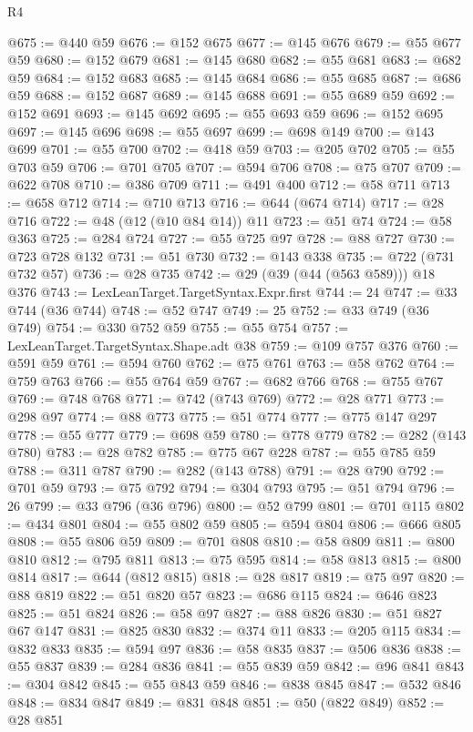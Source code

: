 \begin{lexlean}{R4}
\begin{coremodule}
@675 := @440 @59
@676 := @152 @675
@677 := @145 @676
@679 := @55 @677 @59
@680 := @152 @679
@681 := @145 @680
@682 := @55 @681
@683 := @682 @59
@684 := @152 @683
@685 := @145 @684
@686 := @55 @685
@687 := @686 @59
@688 := @152 @687
@689 := @145 @688
@691 := @55 @689 @59
@692 := @152 @691
@693 := @145 @692
@695 := @55 @693 @59
@696 := @152 @695
@697 := @145 @696
@698 := @55 @697
@699 := @698 @149
@700 := @143 @699
@701 := @55 @700
@702 := @418 @59
@703 := @205 @702
@705 := @55 @703 @59
@706 := @701 @705
@707 := @594 @706
@708 := @75 @707
@709 := @622 @708
@710 := @386 @709
@711 := @491 @400
@712 := @58 @711
@713 := @658 @712
@714 := @710 @713
@716 := @644 (@674 @714)
@717 := @28 @716
@722 := @48 (@12 (@10 @84 @14)) @11
@723 := @51 @74
@724 := @58 @363
@725 := @284 @724
@727 := @55 @725 @97
@728 := @88 @727
@730 := @723 @728 @132
@731 := @51 @730
@732 := @143 @338
@735 := @722 (@731 @732 @57)
@736 := @28 @735
@742 := @29 (@39 (@44 (@563 @589))) @18 @376
@743 := LexLeanTarget.TargetSyntax.Expr.first
@744 := 24
@747 := @33 @744 (@36 @744)
@748 := @52 @747
@749 := 25
@752 := @33 @749 (@36 @749)
@754 := @330 @752 @59
@755 := @55 @754
@757 := LexLeanTarget.TargetSyntax.Shape.adt @38
@759 := @109 @757 @376
@760 := @591 @59
@761 := @594 @760
@762 := @75 @761
@763 := @58 @762
@764 := @759 @763
@766 := @55 @764 @59
@767 := @682 @766
@768 := @755 @767
@769 := @748 @768
@771 := @742 (@743 @769)
@772 := @28 @771
@773 := @298 @97
@774 := @88 @773
@775 := @51 @774
@777 := @775 @147 @297
@778 := @55 @777
@779 := @698 @59
@780 := @778 @779
@782 := @282 (@143 @780)
@783 := @28 @782
@785 := @775 @67 @228
@787 := @55 @785 @59
@788 := @311 @787
@790 := @282 (@143 @788)
@791 := @28 @790
@792 := @701 @59
@793 := @75 @792
@794 := @304 @793
@795 := @51 @794
@796 := 26
@799 := @33 @796 (@36 @796)
@800 := @52 @799
@801 := @701 @115
@802 := @434 @801
@804 := @55 @802 @59
@805 := @594 @804
@806 := @666 @805
@808 := @55 @806 @59
@809 := @701 @808
@810 := @58 @809
@811 := @800 @810
@812 := @795 @811
@813 := @75 @595
@814 := @58 @813
@815 := @800 @814
@817 := @644 (@812 @815)
@818 := @28 @817
@819 := @75 @97
@820 := @88 @819
@822 := @51 @820 @57
@823 := @686 @115
@824 := @646 @823
@825 := @51 @824
@826 := @58 @97
@827 := @88 @826
@830 := @51 @827 @67 @147
@831 := @825 @830
@832 := @374 @11
@833 := @205 @115
@834 := @832 @833
@835 := @594 @97
@836 := @58 @835
@837 := @506 @836
@838 := @55 @837
@839 := @284 @836
@841 := @55 @839 @59
@842 := @96 @841
@843 := @304 @842
@845 := @55 @843 @59
@846 := @838 @845
@847 := @532 @846
@848 := @834 @847
@849 := @831 @848
@851 := @50 (@822 @849)
@852 := @28 @851

\end{coremodule}
\end{lexlean}
